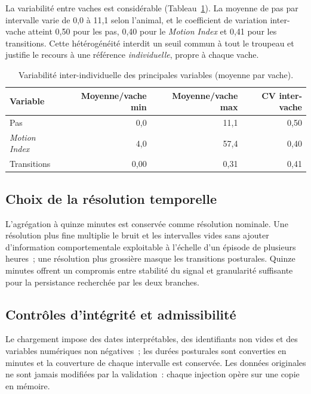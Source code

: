 La variabilité entre vaches est considérable (Tableau~\ref{tab:variabilite}). La moyenne de
pas par intervalle varie de 0,0 à 11,1 selon l'animal, et le coefficient de variation
inter-vache atteint 0,50 pour les pas, 0,40 pour le \textit{Motion Index} et 0,41 pour les
transitions. Cette hétérogénéité interdit un seuil commun à tout le troupeau et justifie le
recours à une référence \emph{individuelle}, propre à chaque vache.

\begin{table}[H]
  \centering
  \caption{Variabilité inter-individuelle des principales variables (moyenne par vache).}
  \label{tab:variabilite}
  \begin{tabular}{lrrr}
    \toprule
    Variable & Moyenne/vache min & Moyenne/vache max & CV inter-vache \\
    \midrule
    Pas & 0,0 & 11,1 & 0,50 \\
    \textit{Motion Index} & 4,0 & 57,4 & 0,40 \\
    Transitions & 0,00 & 0,31 & 0,41 \\
    \bottomrule
  \end{tabular}
\end{table}

\subsection{Choix de la résolution temporelle}

L'agrégation à quinze minutes est conservée comme résolution nominale. Une résolution plus
fine multiplie le bruit et les intervalles vides sans ajouter d'information comportementale
exploitable à l'échelle d'un épisode de plusieurs heures~; une résolution plus grossière
masque les transitions posturales. Quinze minutes offrent un compromis entre stabilité du
signal et granularité suffisante pour la persistance recherchée par les deux branches.

\subsection{Contrôles d'intégrité et admissibilité}

Le chargement impose des dates interprétables, des identifiants non vides et des variables
numériques non négatives~; les durées posturales sont converties en minutes et la couverture
de chaque intervalle est conservée. Les données originales ne sont jamais modifiées par la
validation~: chaque injection opère sur une copie en mémoire.

